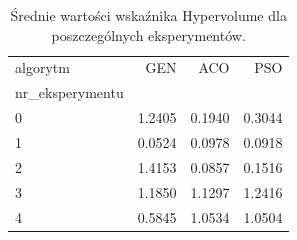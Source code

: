 \begin{table}
\caption{Średnie wartości wskaźnika Hypervolume dla poszczególnych eksperymentów.}
\label{tab:hv_srednie}
\begin{tabular}{lrrr}
\toprule
algorytm & GEN & ACO & PSO \\
nr_eksperymentu &  &  &  \\
\midrule
0 & 1.2405 & 0.1940 & 0.3044 \\
1 & 0.0524 & 0.0978 & 0.0918 \\
2 & 1.4153 & 0.0857 & 0.1516 \\
3 & 1.1850 & 1.1297 & 1.2416 \\
4 & 0.5845 & 1.0534 & 1.0504 \\
\bottomrule
\end{tabular}
\end{table}
